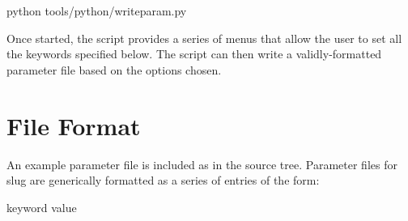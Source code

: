 \documentclass[letterpaper,10pt,english]{sphinxmanual}
\begin{document}
\begin{sphinxVerbatim}[commandchars=\\\{\}]
python tools/python/write\PYGZus{}param.py
\end{sphinxVerbatim}

Once started, the script provides a series of menus that allow the user to set all the keywords specified below. The script can then write a validly-formatted parameter file based on the options chosen.


\section{File Format}
\label{\detokenize{parameters:file-format}}
An example parameter file is included as  in the source tree. Parameter files for slug are generically formatted as a series of entries of the form:

\begin{sphinxVerbatim}[commandchars=\\\{\}]
keyword    value
\end{sphinxVerbatim}
\end{document}
